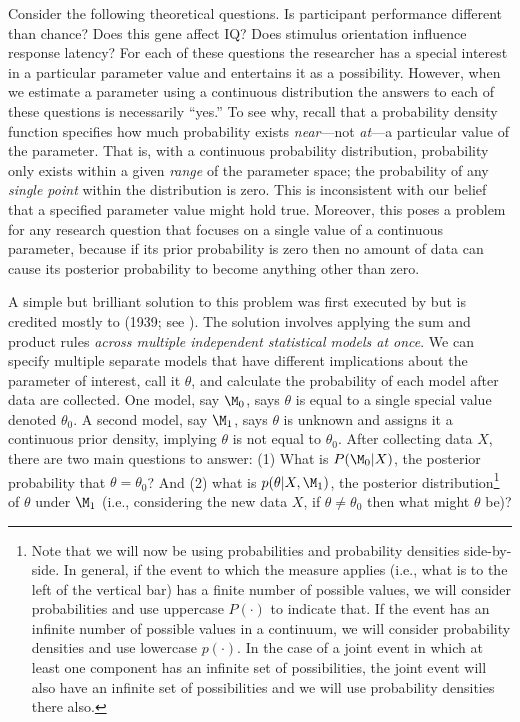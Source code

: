 Consider the following theoretical questions. Is participant performance different than chance? Does this gene affect IQ? Does stimulus orientation influence response latency? For each of these questions the researcher has a special interest in a particular parameter value and entertains it as a possibility. However, when we estimate a parameter using a continuous distribution the answers to each of these questions is necessarily ``yes.'' To see why, recall that a probability density function specifies how much probability exists \emph{near}---not \emph{at}---a particular value of the parameter. That is, with a continuous probability distribution, probability only exists within a given \textit{range} of the parameter space; the probability of any \textit{single point} within the distribution is zero. This is inconsistent with our belief that a specified parameter value might hold true. Moreover, this poses a problem for any research question that focuses on a single value of a continuous parameter, because if its prior probability is zero then no amount of data can cause its posterior probability to become anything other than zero.

A simple but brilliant solution to this problem was first  {executed} by  but is credited mostly to \citeauthor{Jeffreys1939} (1939; see ).  The solution involves applying the sum and product rules \emph{across multiple independent statistical models at once}. We can specify multiple separate models that have different implications about the parameter of interest, call it $\theta$, and calculate the probability of each model after data are collected. One model, say $\M_0$, says $\theta$ is equal to a single special value denoted $\theta_0$. A second model, say $\M_1$, says $\theta$ is unknown and assigns it a continuous prior density, implying $\theta$ is not equal to $\theta_0$.
After collecting data $X$, there are two main questions to answer: (1) What is $P(\M_0|X)$, the posterior probability that $\theta=\theta_0$? And (2) what is  $p(\theta|X,\M_1)$, the posterior distribution\footnote{Note that we will now be using probabilities and probability densities side-by-side. In general, if the event to which the measure applies (i.e., what is to the left of the vertical bar) has a finite number of possible values, we will consider probabilities and use uppercase $P(\cdot)$ to indicate that. If the event has an infinite number of possible values in a continuum, we will consider probability densities and use lowercase $p(\cdot)$. In the case of a joint event in which at least one component has an infinite set of possibilities, the joint event will also have an infinite set of possibilities and we will use probability densities there also.}
of $\theta$ under $\M_1$ (i.e., considering the new data $X$, if $\theta\neq\theta_0$ then what might $\theta$ be)?

